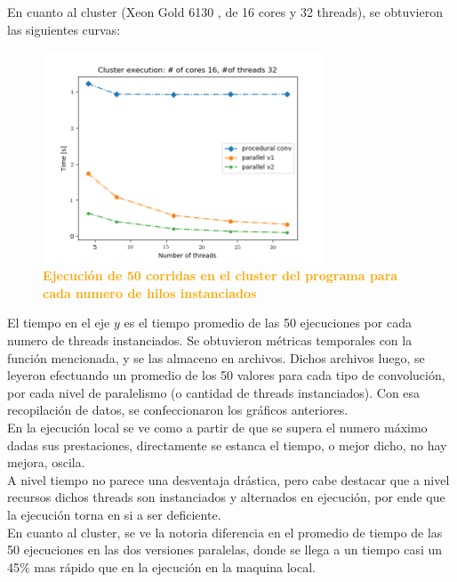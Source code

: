 \documentclass{article}
\begin{document}
En cuanto al cluster (Xeon Gold 6130 , de 16 cores y 32 threads), se obtuvieron las siguientes curvas:\\
  \begin{figure}[H]
    \centering
      \includegraphics[width=0.75\textwidth]{figures/time_cluster.png}
       \centering
       \caption{\textbf{\textcolor{Orange}{Ejecución de 50 corridas en el cluster del programa para cada numero de hilos instanciados}}}
    \end{figure}   
    
 El tiempo en el eje $y$ es el tiempo promedio de las 50 ejecuciones por cada numero de threads instanciados. Se obtuvieron métricas temporales con la función mencionada, y se las almaceno en archivos. Dichos archivos luego, se leyeron efectuando un promedio de los 50 valores para cada tipo de convolución, por cada nivel de paralelismo (o cantidad de threads instanciados). Con esa recopilación de datos, se confeccionaron los gráficos anteriores.\\
 
 En la ejecución local se ve como a partir de que se supera el numero máximo dadas sus prestaciones, directamente se estanca el tiempo, o mejor dicho, no hay mejora, oscila.\\
 
A nivel tiempo no parece una desventaja drástica, pero cabe destacar que a nivel recursos dichos threads son instanciados y alternados en ejecución, por ende que la ejecución torna en si a ser deficiente. \\
 
 En cuanto al cluster, se ve la notoria diferencia en el promedio de tiempo de las 50 ejecuciones en las dos versiones paralelas, donde se llega a un tiempo casi un 45\% mas rápido que en la ejecución en la maquina local. \\
 
\end{document}
